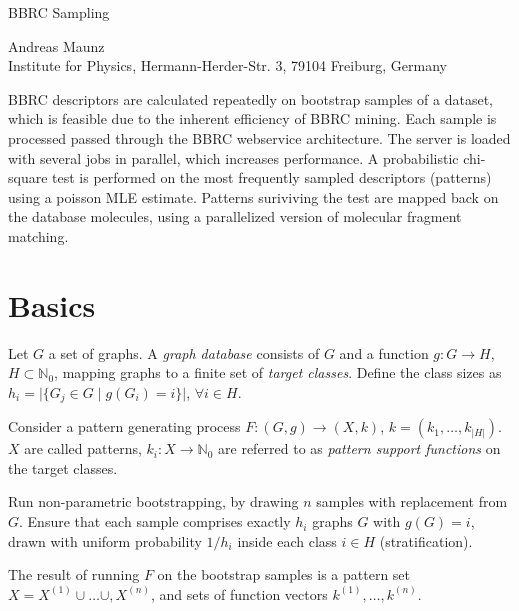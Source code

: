 \documentclass[a4paper,10pt]{article}
\begin{document}
\begin{center}
\begin{huge}BBRC Sampling\end{huge}

Andreas Maunz \\Institute for Physics, Hermann-Herder-Str. 3, 79104 Freiburg, Germany
\end{center}

\begin{small}
BBRC descriptors are calculated repeatedly on bootstrap samples of a dataset, which is feasible due to the inherent efficiency of BBRC mining.
Each sample is processed passed through the BBRC webservice architecture. The server is loaded with several jobs in parallel, which increases performance.
A probabilistic chi-square test is performed on the most frequently sampled descriptors (patterns) using a poisson MLE estimate.
Patterns suriviving the test are mapped back on the database molecules, using a parallelized version of molecular fragment matching.
\end{small}

\section{Basics}
Let $G$ a set of graphs. A \emph{graph database} consists of $G$ and a function $g: G \rightarrow H$, $H \subset \mathbb{N}_0$, mapping graphs to a finite set of \emph{target classes}. Define the class sizes as $h_i=\vert\{G_j \in G \; \vert\; g(G_i)=i\}\vert$, $\forall i \in H$.

Consider a pattern generating process $F: (G,g) \rightarrow (X,k)$, $k=\left(k_1,\ldots,k_{\vert H\vert}\right)$. $X$ are called patterns, $k_i: X \rightarrow \mathbb{N}_0$ are referred to as \emph{pattern support functions} on the target classes.

Run non-parametric bootstrapping, by drawing $n$ samples with replacement from $G$. Ensure that each sample comprises exactly $h_i$ graphs $G$ with $g(G)=i$, drawn with uniform probability $1/h_i$ inside each class $i \in H$ (stratification).

The result of running $F$ on the bootstrap samples is a pattern set $X= X^{(1)}\cup\ldots\cup,X^{(n)}$, and sets of function vectors $k^{(1)},\ldots,k^{(n)}$.
\end{document}
